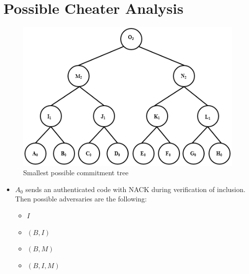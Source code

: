 \section{Possible Cheater Analysis}
	\begin{exmp}
		\begin{figure}[t]
			\centering
			\includegraphics{images/possible-cheaters.png}
			\caption{Smallest possible commitment tree}
			\label{fig:cheating}
		\end{figure}

		\begin{itemize}
			\item $A_{0}$ sends an authenticated code with NACK during verification of inclusion.
			Then possible adversaries are the following:
				\begin{itemize}
					\item $I$
					\item $(B, I)$
					\item $(B, M)$
					\item $(B, I, M)$
				\end{itemize}
		\end{itemize}
	\end{exmp}

	
  
